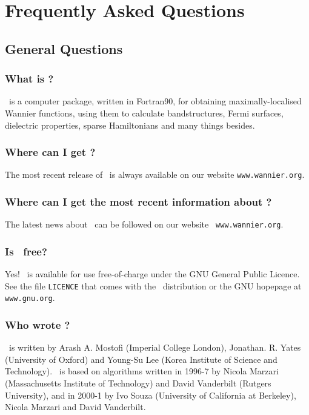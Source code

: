 \chapter{Frequently Asked Questions}\label{chap:faq}


\section{General Questions}

\subsection{What is \wannier?}

\wannier\ is a computer package, written in Fortran90, for obtaining
maximally-localised Wannier functions, using them to calculate
bandstructures, Fermi surfaces, dielectric properties, sparse
Hamiltonians and many things besides.

\subsection{Where can I get \wannier?}

The most recent release of \wannier\ is always available on our
website {\tt www.wannier.org}.

\subsection{Where can I get the most recent information about
  \wannier?}

The latest news about \wannier\ can be followed on our website {\tt
  www.wannier.org}.

\subsection{Is \wannier\ free?}

Yes! \wannier\ is available for use free-of-charge under the GNU
General Public Licence. See the file {\tt LICENCE} that comes with the
\wannier\ distribution or the GNU hopepage at {\tt www.gnu.org}. 

\subsection{Who wrote \wannier?}

\wannier\ is written by Arash A. Mostofi (Imperial College London),
Jonathan. R. Yates (University of Oxford) and Young-Su Lee (Korea
Institute of Science and Technology). \wannier\ is based on algorithms
written in 1996-7 by Nicola Marzari (Massachusetts Institute of
Technology) and David Vanderbilt (Rutgers University), and in 2000-1
by Ivo Souza (University of California at Berkeley), Nicola Marzari
and David Vanderbilt.

